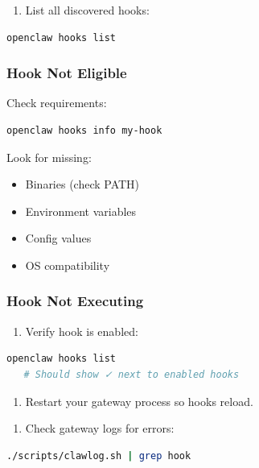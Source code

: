 \begin{enumerate}
  \item List all discovered hooks:
\end{enumerate}


\begin{lstlisting}[language=bash]
   openclaw hooks list
\end{lstlisting}


\subsubsection{Hook Not Eligible}


Check requirements:

\begin{lstlisting}[language=bash]
openclaw hooks info my-hook
\end{lstlisting}


Look for missing:

\begin{itemize}
  \item Binaries (check PATH)
  \item Environment variables
  \item Config values
  \item OS compatibility
\end{itemize}


\subsubsection{Hook Not Executing}


\begin{enumerate}
  \item Verify hook is enabled:
\end{enumerate}


\begin{lstlisting}[language=bash]
   openclaw hooks list
   # Should show ✓ next to enabled hooks
\end{lstlisting}


\begin{enumerate}
  \item Restart your gateway process so hooks reload.
\end{enumerate}


\begin{enumerate}
  \item Check gateway logs for errors:
\end{enumerate}


\begin{lstlisting}[language=bash]
   ./scripts/clawlog.sh | grep hook
\end{lstlisting}


